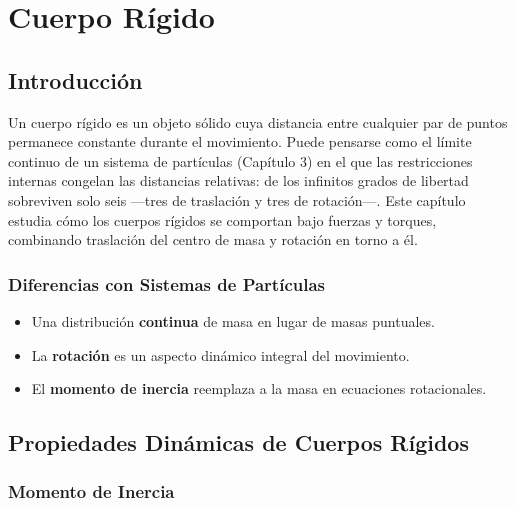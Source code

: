 
\chapter{Cuerpo Rígido}

\section*{Introducción}

Un cuerpo rígido es un objeto sólido cuya distancia entre cualquier par de puntos permanece constante durante el movimiento. Puede pensarse como el límite continuo de un sistema de partículas (Capítulo 3) en el que las restricciones internas congelan las distancias relativas: de los infinitos grados de libertad sobreviven solo seis —tres de traslación y tres de rotación—. Este capítulo estudia cómo los cuerpos rígidos se comportan bajo fuerzas y torques, combinando traslación del centro de masa y rotación en torno a él.

\subsection*{Diferencias con Sistemas de Partículas}

\begin{itemize}
    \item Una distribución \textbf{continua} de masa en lugar de masas puntuales.
    \item La \textbf{rotación} es un aspecto dinámico integral del movimiento.
    \item El \textbf{momento de inercia} reemplaza a la masa en ecuaciones rotacionales.
\end{itemize}

\section{Propiedades Dinámicas de Cuerpos Rígidos}

\subsection*{Momento de Inercia}

